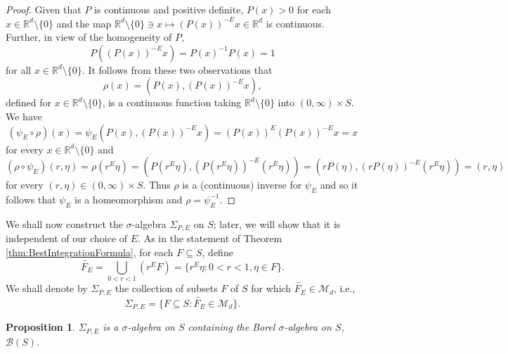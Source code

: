 \documentclass[11pt]{article}
\newtheorem{proposition}[theorem]{Proposition}
\theoremstyle{remark}
\begin{document}
\begin{proof}
Given that $P$ is continuous and positive definite, $P(x)>0$ for each $x\in \mathbb{R}^d\setminus\{0\}$ and the map $\mathbb{R}^d\setminus\{0\}\ni x \mapsto (P(x))^{-E}x\in \mathbb{R}^d$ is continuous. Further, in view of the homogeneity of $P$,
\begin{equation*}
P\left((P(x))^{-E} x \right)=P(x)^{-1}P(x)=1
\end{equation*}
for all $x\in\mathbb{R}^d\setminus\{0\}$. It follows from these two observations that
\begin{equation*}
\rho(x)=(P(x),(P(x))^{-E}x),
\end{equation*}
defined for $x\in\mathbb{R}^d\setminus\{0\}$, is a continuous function taking $\mathbb{R}^d\setminus\{0\}$ into $(0,\infty)\times S$. We have
\begin{equation*}
(\psi_E\circ \rho)(x)=\psi_E(P(x),(P(x))^{-E}x)=(P(x))^{E}(P(x))^{-E}x=x
\end{equation*}
for every $x\in \mathbb{R}^d\setminus \{0\}$ and
\begin{equation*}
(\rho\circ\psi_E)(r,\eta)=\rho(r^E\eta)=(P(r^{E}\eta),(P(r^{E}\eta))^{-E}(r^E\eta))=(rP(\eta),(rP(\eta))^{-E}(r^{E}\eta))=(r,\eta)
\end{equation*}
for every $(r,\eta)\in (0,\infty)\times S$. Thus $\rho$ is a (continuous) inverse for $\psi_E$ and so it follows that $\psi_E$ is a homeomorphism and $\rho=\psi_E^{-1}$.
\end{proof}



\noindent We shall now construct the $\sigma$-algebra $\Sigma_{P,E}$ on $S$; later, we will show that it is independent of our choice of $E$. As in the statement of Theorem \ref{thm:BestIntegrationFormula}, for each $F\subseteq S$, define
\begin{equation*}
\widetilde{F_E}=\bigcup_{0<r<1}\left(r^E F\right)=\{r^E\eta:0<r<1,\eta\in F\}. 
\end{equation*}
We shall denote by $\Sigma_{P,E}$ the collection of subsets $F$ of $S$ for which $\widetilde{F_E}\in\mathcal{M}_d$, i.e.,  
\begin{equation*}
\Sigma_{P,E}=\{F\subseteq S:\widetilde{F_E}\in\mathcal{M}_d\}.
\end{equation*}


\begin{proposition}\label{prop:BorelContainment}
$\Sigma_{P,E}$ is a $\sigma$-algebra on $S$ containing the Borel $\sigma$-algebra on $S$, $\mathcal{B}(S)$.
\end{proposition}
\end{document}
